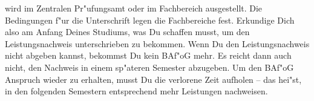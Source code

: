 \begin{artikel}{}
\vspace{-19pt}
wird im Zentralen Pr"ufungsamt oder im Fachbereich ausgestellt. Die Bedingungen f"ur die Unterschrift legen die Fachbereiche fest. Erkundige Dich also am Anfang Deines Studiums, was Du schaffen musst, um den Leistungsnachweis unterschrieben zu bekommen. Wenn Du den Leistungsnachweis nicht abgeben kannst, bekommst Du kein BAf"oG mehr. Es reicht dann auch nicht, den Nachweis in einem sp"ateren Semester abzugeben. Um den BAf"oG Anspruch wieder zu erhalten, musst Du die verlorene Zeit aufholen -- das hei"st, in den folgenden Semestern entsprechend mehr Leistungen nachweisen.
\end{artikel}
